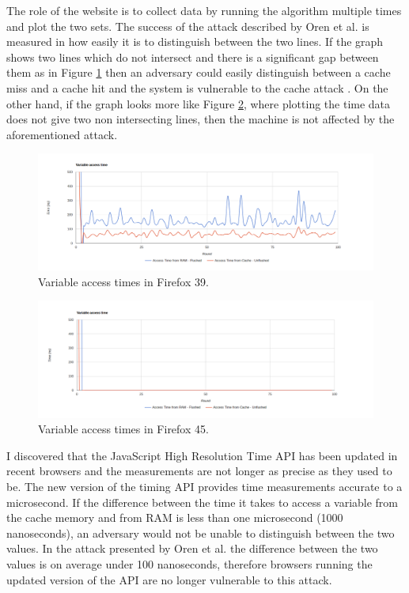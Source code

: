 \documentclass[10pt,a4paper,twoside]{book}
\begin{document}
The role of the website is to collect data by running the algorithm multiple times and plot the two sets. The success of the attack described by Oren et al. \cite{oren2015spy} is measured in how easily it is to distinguish between the two lines. If the graph shows two lines which do not intersect and there is a significant gap between them as in Figure \ref{firefox39} then an adversary could easily distinguish between a cache miss and a cache hit and the system is vulnerable to the cache attack \cite{oren2015spy}. On the other hand, if the graph looks more like Figure \ref{firefox45}, where plotting the time data does not give two non intersecting lines, then the machine is not affected by the aforementioned attack.

\begin{figure}[h]
\centering
\includegraphics[width=\textwidth]{figures/firefox39.png}
\caption{Variable access times in Firefox 39.}
\label{firefox39}
\end{figure}

\begin{figure}[h]
\centering
\includegraphics[width=\textwidth]{figures/firefox45.png}
\caption{Variable access times in Firefox 45.}
\label{firefox45}
\end{figure}

I discovered that the JavaScript High Resolution Time API has been updated in recent browsers and the measurements are not longer as precise as they used to be. The new version of the timing API provides time measurements accurate to a microsecond. If the difference between the time it takes to access a variable from the cache memory and from RAM is less than one microsecond (1000 nanoseconds), an adversary would not be unable to distinguish between the two values. In the attack presented by Oren et al. \cite{oren2015spy} the difference between the two values is on average under 100 nanoseconds, therefore browsers running the updated version of the API are no longer vulnerable to this attack. 
\end{document}
